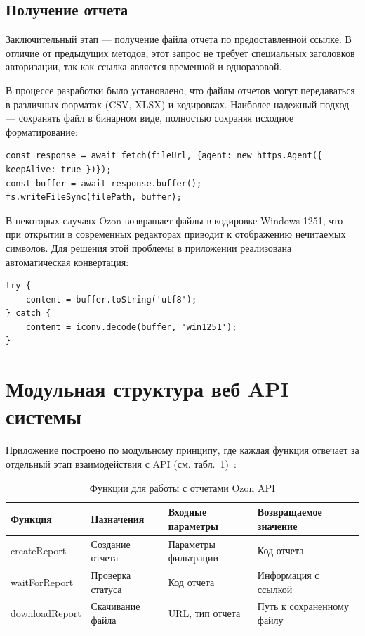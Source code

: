 \subsection{Получение отчета}

Заключительный этап — получение файла отчета по предоставленной ссылке. В отличие от предыдущих методов, этот запрос не требует специальных заголовков авторизации, так как ссылка является временной и одноразовой.

В процессе разработки было установлено, что файлы отчетов могут передаваться в различных форматах (CSV, XLSX) и кодировках. Наиболее надежный подход — сохранять файл в бинарном виде, полностью сохраняя исходное форматирование:
\begin{code}
\label{code:writeFileSync}
\vspace{-0.75cm}\begin{verbatim}
const response = await fetch(fileUrl, {agent: new https.Agent({ keepAlive: true })});
const buffer = await response.buffer();
fs.writeFileSync(filePath, buffer);
\end{verbatim}
\end{code}

В некоторых случаях Ozon возвращает файлы в кодировке Windows-1251, что при открытии в современных редакторах приводит к отображению нечитаемых символов. Для решения этой проблемы в приложении реализована автоматическая конвертация:
\begin{code}
\label{code:convert}
\vspace{-0.75cm}\begin{verbatim}
try {
    content = buffer.toString('utf8');
} catch {
    content = iconv.decode(buffer, 'win1251');
}
\end{verbatim}
\end{code}

\section{Модульная структура веб API системы}

Приложение построено по модульному принципу, где каждая функция отвечает за отдельный этап взаимодействия с API (см. табл.~\ref{tab:funcWorkAPI})~\cite{ozonSellerAPI}:
\begin{table}[H]
\caption{\label{tab:funcWorkAPI}Функции для работы с отчетами Ozon API}
\begin{tabular}{|p{3.5cm}|p{3cm}|p{4.5cm}|p{4cm}|}
\hline
Функция & Назначения & Входные параметры & Возвращаемое значение \\ \hline
createReport & Создание отчета & Параметры фильтрации & Код отчета \\ \hline
waitForReport & Проверка статуса & Код отчета & Информация с ссылкой \\ \hline
downloadReport & Скачивание файла & URL, тип отчета & Путь к сохраненному файлу \\ \hline
\end{tabular}
\end{table}

